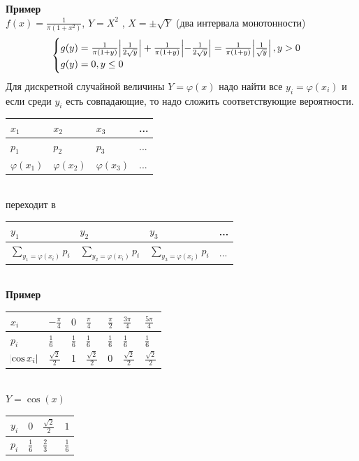 \documentclass[russian, 12pt, fleqn,x11names]{article}
\begin{document}
\textbf{Пример} \\
$f(x) = \frac{1}{\pi (1+x^2)}$, $Y=X^2$ , $X = \pm \sqrt{Y}$ (два интервала монотонности)\\
\begin{equation*} 
 \begin{cases}
   g(y) = \frac{1}{\pi(1+y)} \abs{\frac{1}{2\sqrt{y}}} + \frac{1}{\pi(1+y)} \abs{-\frac{1}{2\sqrt{y}}} = \frac{1}{\pi(1+y)} \abs{\frac{1}{\sqrt{y}}}, y > 0 \\
   g(y) = 0, y \leq 0
 \end{cases}
\end{equation*}
Для дискретной случайной величины $Y=\varphi(x)$ надо найти все $y_i = \varphi(x_i)$ и если среди $y_i$ есть совпадающие, то надо сложить соответствующие вероятности.\\
\begin{tabular}[b]{ | l | l |  l | l |   }
\hline
$x_1$ & $x_2$ & $x_3$ & ... \\
\hline
$p_1$ & $p_2$ & $p_3$ & ... \\
\hline
$\varphi(x_1)$ & $\varphi(x_2)$ & $\varphi(x_3)$ & ... \\
\hline
\end{tabular}\\
переходит в\\
\begin{tabular}[b]{ | l | l |  l | l |   }
\hline
$y_1$ & $y_2$ & $y_3$ & ... \\
\hline
$\displaystyle{\sum_{y_1 = \varphi (x_i) } } p_i$ & $\displaystyle{\sum_{y_2 = \varphi (x_i) } } p_i$ & $\displaystyle{\sum_{y_3 = \varphi (x_i) } } p_i$ & ... \\
\hline
\end{tabular}\\
\textbf{Пример}\\
\begin{tabular}[b]{ | l | l |  l | l |  l | l | l |  }
\hline
$x_i$&$-\frac{\pi}{4}$&$0$&$\frac{\pi}{4}$&$\frac{\pi}{2}$&$\frac{3\pi}{4}$&$\frac{5\pi}{4}$\\
\hline
$p_i$&$\frac{1}{6}$&$\frac{1}{6}$&$\frac{1}{6}$&$\frac{1}{6}$&$\frac{1}{6}$&$\frac{1}{6}$\\
\hline
$\abs{\cos x_i}$&$\frac{\sqrt{2}}{2}$&1&$\frac{\sqrt{2}}{2}$&0&$\frac{\sqrt{2}}{2}$&$\frac{\sqrt{2}}{2}$\\
\hline
\end{tabular}\\
$Y=\cos(x)$\\
\begin{tabular}[b]{ | l | l |  l | l |}
\hline
$y_i$ &$0$ & $\frac{\sqrt{2}}{2}$&$1$\\
\hline
$p_i$ & $\frac{1}{6}$ & $\frac{2}{3}$ & $\frac{1}{6}$\\
\hline
\end{tabular}\\
\newpage
\end{document}
